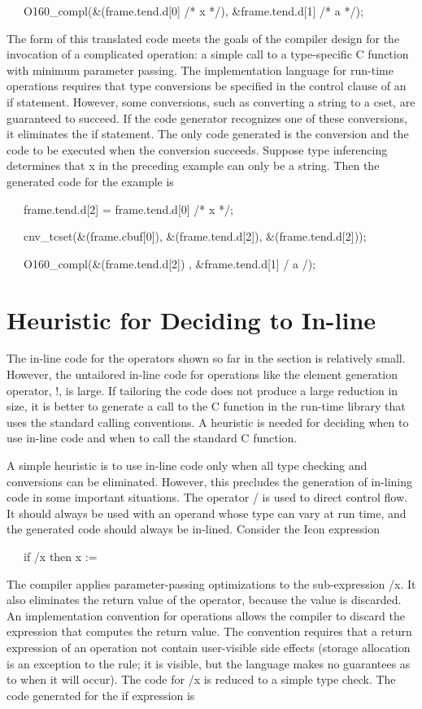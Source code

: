 {\ttfamily\mdseries
\ \ \ O160\_compl(\&(frame.tend.d[0] /* x */), \&frame.tend.d[1] /* a */);}


The form of this translated code meets the goals of the compiler
design for the invocation of a complicated operation: a simple call to
a type-specific C function with minimum parameter passing. The
implementation language for run-time operations requires that type
conversions be specified in the control clause of an if
statement. However, some conversions, such as converting a string to a
cset, are guaranteed to succeed. If the code generator recognizes one
of these conversions, it eliminates the if statement. The only code
generated is the conversion and the code to be executed when the
conversion succeeds. Suppose type inferencing determines that x in the
preceding example can only be a string. Then the generated code for
the example is

{\ttfamily\mdseries
\ \ \ frame.tend.d[2] = frame.tend.d[0] /* x */;}

{\ttfamily\mdseries
\ \ \ cnv\_tcset(\&(frame.cbuf[0]), \&(frame.tend.d[2]), \&(frame.tend.d[2]));}

{\ttfamily\mdseries
\ \ \ O160\_compl(\&(frame.tend.d[2]) , \&frame.tend.d[1] / a /);}


\section{Heuristic for Deciding to In-line}

The in-line code for the operators shown so far in the section is
relatively small. However, the untailored in-line code for operations
like the element generation operator, !, is large. If tailoring the
code does not produce a large reduction in size, it is better to
generate a call to the C function in the run-time library that uses
the standard calling conventions. A heuristic is needed for deciding
when to use in-line code and when to call the standard C function.


A simple heuristic is to use in-line code only when all type checking
and conversions can be eliminated. However, this precludes the
generation of in-lining code in some important situations. The
operator / is used to direct control flow.  It should always be used
with an operand whose type can vary at run time, and the generated
code should always be in-lined. Consider the Icon expression

{\ttfamily\mdseries
\ \ \ if /x then x := }

The compiler applies parameter-passing optimizations to the
sub-expression /x. It also eliminates the return value of the
operator, because the value is discarded. An implementation convention
for operations allows the compiler to discard the expression that
computes the return value. The convention requires that a return
expression of an operation not contain user-visible side effects
(storage allocation is an exception to the rule; it is visible, but
the language makes no guarantees as to when it will occur). The code
for /x is reduced to a simple type check. The code generated for the
if expression is

